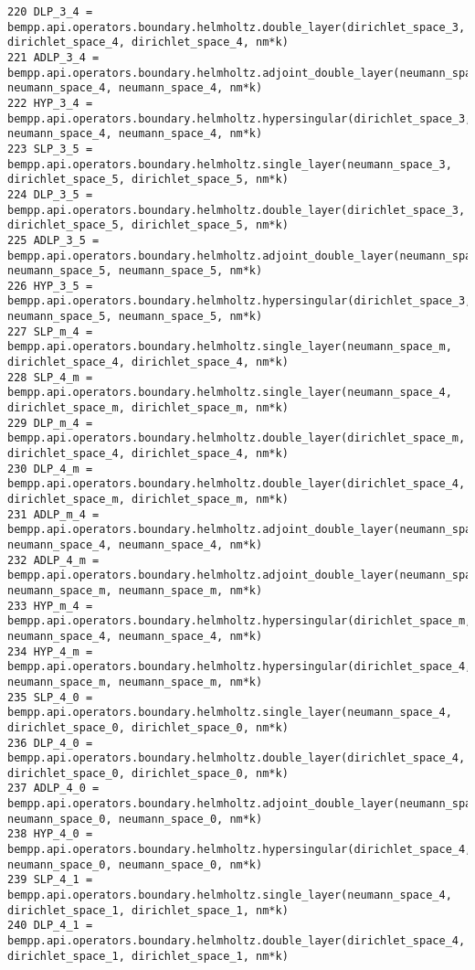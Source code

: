 \documentclass[12pt,letterpaper]{article}
\numberwithin{equation}{section}
\begin{document}
\begin{lstlisting}
220 DLP_3_4 = bempp.api.operators.boundary.helmholtz.double_layer(dirichlet_space_3, dirichlet_space_4, dirichlet_space_4, nm*k)
221 ADLP_3_4 = bempp.api.operators.boundary.helmholtz.adjoint_double_layer(neumann_space_3, neumann_space_4, neumann_space_4, nm*k)
222 HYP_3_4 = bempp.api.operators.boundary.helmholtz.hypersingular(dirichlet_space_3, neumann_space_4, neumann_space_4, nm*k)
223 SLP_3_5 = bempp.api.operators.boundary.helmholtz.single_layer(neumann_space_3, dirichlet_space_5, dirichlet_space_5, nm*k)
224 DLP_3_5 = bempp.api.operators.boundary.helmholtz.double_layer(dirichlet_space_3, dirichlet_space_5, dirichlet_space_5, nm*k)
225 ADLP_3_5 = bempp.api.operators.boundary.helmholtz.adjoint_double_layer(neumann_space_3, neumann_space_5, neumann_space_5, nm*k)
226 HYP_3_5 = bempp.api.operators.boundary.helmholtz.hypersingular(dirichlet_space_3, neumann_space_5, neumann_space_5, nm*k)
227 SLP_m_4 = bempp.api.operators.boundary.helmholtz.single_layer(neumann_space_m, dirichlet_space_4, dirichlet_space_4, nm*k)
228 SLP_4_m = bempp.api.operators.boundary.helmholtz.single_layer(neumann_space_4, dirichlet_space_m, dirichlet_space_m, nm*k)
229 DLP_m_4 = bempp.api.operators.boundary.helmholtz.double_layer(dirichlet_space_m, dirichlet_space_4, dirichlet_space_4, nm*k)
230 DLP_4_m = bempp.api.operators.boundary.helmholtz.double_layer(dirichlet_space_4, dirichlet_space_m, dirichlet_space_m, nm*k)
231 ADLP_m_4 = bempp.api.operators.boundary.helmholtz.adjoint_double_layer(neumann_space_m, neumann_space_4, neumann_space_4, nm*k)
232 ADLP_4_m = bempp.api.operators.boundary.helmholtz.adjoint_double_layer(neumann_space_4, neumann_space_m, neumann_space_m, nm*k)
233 HYP_m_4 = bempp.api.operators.boundary.helmholtz.hypersingular(dirichlet_space_m, neumann_space_4, neumann_space_4, nm*k)
234 HYP_4_m = bempp.api.operators.boundary.helmholtz.hypersingular(dirichlet_space_4, neumann_space_m, neumann_space_m, nm*k)
235 SLP_4_0 = bempp.api.operators.boundary.helmholtz.single_layer(neumann_space_4, dirichlet_space_0, dirichlet_space_0, nm*k)
236 DLP_4_0 = bempp.api.operators.boundary.helmholtz.double_layer(dirichlet_space_4, dirichlet_space_0, dirichlet_space_0, nm*k)
237 ADLP_4_0 = bempp.api.operators.boundary.helmholtz.adjoint_double_layer(neumann_space_4, neumann_space_0, neumann_space_0, nm*k)
238 HYP_4_0 = bempp.api.operators.boundary.helmholtz.hypersingular(dirichlet_space_4, neumann_space_0, neumann_space_0, nm*k)
239 SLP_4_1 = bempp.api.operators.boundary.helmholtz.single_layer(neumann_space_4, dirichlet_space_1, dirichlet_space_1, nm*k)
240 DLP_4_1 = bempp.api.operators.boundary.helmholtz.double_layer(dirichlet_space_4, dirichlet_space_1, dirichlet_space_1, nm*k)

\end{lstlisting}
\end{document}
